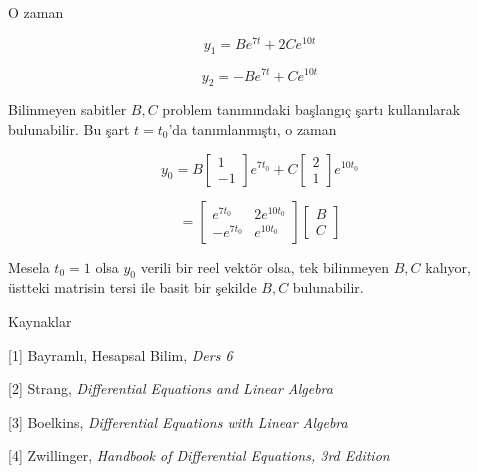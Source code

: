 \documentclass[12pt,fleqn]{article}\usepackage{../../common}
\begin{document}
O zaman

$$
y_1 = B e^{7t} + 2C e^{10t}
$$

$$
y_2 = -B e^{7t} + C e^{10t} 
$$

Bilinmeyen sabitler $B,C$ problem tanımındaki başlangıç şartı kullanılarak
bulunabilir. Bu şart $t = t_0$'da tanımlanmıştı, o zaman

$$
y_0 =
B \left[\begin{array}{c} 1 \\ -1  \end{array}\right] e^{7 t_0} +
C \left[\begin{array}{c} 2 \\ 1 \end{array}\right] e^{10 t_0}
$$

$$
= \left[\begin{array}{cc}
e^{7 t_0} & 2 e^{10 t_0} \\
-e^{7 t_0} & e^{10 t_0} 
\end{array}\right]
\left[\begin{array}{c}
B \\ C
\end{array}\right]
$$

Mesela $t_0 = 1$ olsa $y_0$ verili bir reel vektör olsa, tek bilinmeyen $B,C$
kalıyor, üstteki matrisin tersi ile basit bir şekilde $B,C$ bulunabilir.

Kaynaklar

[1] Bayramlı, Hesapsal Bilim, {\em Ders 6}

[2] Strang, {\em Differential Equations and Linear Algebra}

[3] Boelkins, {\em Differential Equations with Linear Algebra}

[4] Zwillinger, {\em Handbook of Differential Equations, 3rd Edition}
\end{document}
